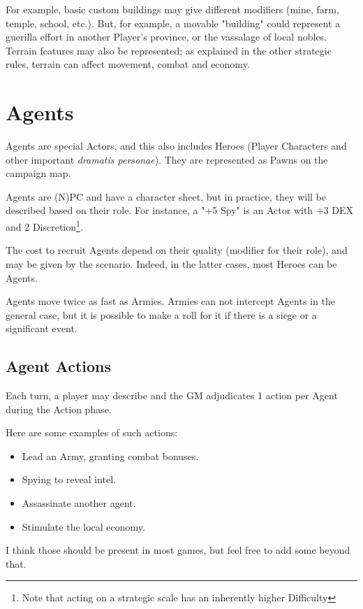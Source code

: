 For example, basic custom buildings may give different modifiers (mine, farm, temple, school, etc.). But, for example, a movable "building" could represent a guerilla effort in another Player's province, or the vassalage of local nobles. Terrain features may also be represented; as explained in the other strategic rules, terrain can affect movement, combat and economy.

\section{Agents}

\label{agents}

Agents are special Actors, and this also includes Heroes (Player Characters and other important \textit{dramatis personae}). They are represented as Pawns on the campaign map.

Agents are (N)PC and have a character sheet, but in practice, they will be described based on their role. For instance, a "+5 Spy" is an Actor with +3 DEX and 2 Discretion\footnote{Note that acting on a strategic scale has an inherently higher Difficulty}.

The cost to recruit Agents depend on their quality (modifier for their role), and may be given by the scenario. Indeed, in the latter cases, most Heroes can be Agents.

Agents move twice as fast as Armies. Armies can not intercept Agents in the general case, but it is possible to make a roll for it if there is a siege or a significant event.

\subsection{Agent Actions}

Each turn, a player may describe and the GM adjudicates 1 action per Agent during the Action phase.

Here are some examples of such actions: 

\begin{itemize}
    \item Lead an Army, granting combat bonuses.
    \item Spying to reveal intel.
    \item Assassinate another agent.
    \item Stimulate the local economy.
\end{itemize}

I think those should be present in most games, but feel free to add some beyond that. 

